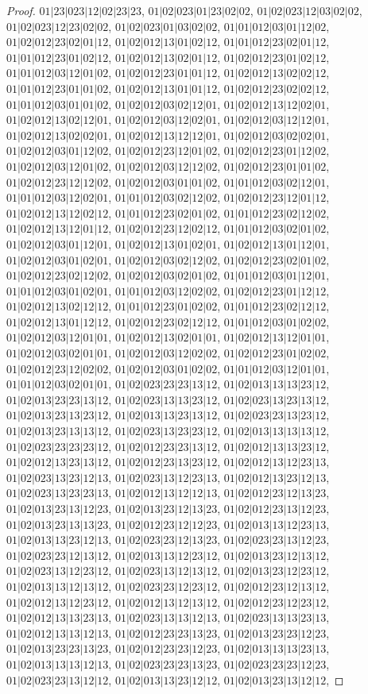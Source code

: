 \documentclass[12pt]{article}
\theoremstyle{plain}
\theoremstyle{definition}
\theoremstyle{remark}
\begin{document}
\begin{proof}
$01|23|023|12|02|23|23$, $01|02|023|01|23|02|02$, $01|02|023|12|03|02|02$, $01|02|023|12|23|02|02$, $01|02|023|01|03|02|02$, $01|01|012|03|01|12|02$, $01|02|012|23|02|01|12$, $01|02|012|13|01|02|12$, $01|01|012|23|02|01|12$, $01|01|012|23|01|02|12$, $01|02|012|13|02|01|12$, $01|02|012|23|01|02|12$, $01|01|012|03|12|01|02$, $01|02|012|23|01|01|12$, $01|02|012|13|02|02|12$, $01|01|012|23|01|01|02$, $01|02|012|13|01|01|12$, $01|02|012|23|02|02|12$, $01|01|012|03|01|01|02$, $01|02|012|03|02|12|01$, $01|02|012|13|12|02|01$, $01|02|012|13|02|12|01$, $01|02|012|03|12|02|01$, $01|02|012|03|12|12|01$, $01|02|012|13|02|02|01$, $01|02|012|13|12|12|01$, $01|02|012|03|02|02|01$, $01|02|012|03|01|12|02$, $01|02|012|23|12|01|02$, $01|02|012|23|01|12|02$, $01|02|012|03|12|01|02$, $01|02|012|03|12|12|02$, $01|02|012|23|01|01|02$, $01|02|012|23|12|12|02$, $01|02|012|03|01|01|02$, $01|01|012|03|02|12|01$, $01|01|012|03|12|02|01$, $01|01|012|03|02|12|02$, $01|02|012|23|12|01|12$, $01|02|012|13|12|02|12$, $01|01|012|23|02|01|02$, $01|01|012|23|02|12|02$, $01|02|012|13|12|01|12$, $01|02|012|23|12|02|12$, $01|01|012|03|02|01|02$, $01|02|012|03|01|12|01$, $01|02|012|13|01|02|01$, $01|02|012|13|01|12|01$, $01|02|012|03|01|02|01$, $01|02|012|03|02|12|02$, $01|02|012|23|02|01|02$, $01|02|012|23|02|12|02$, $01|02|012|03|02|01|02$, $01|01|012|03|01|12|01$, $01|01|012|03|01|02|01$, $01|01|012|03|12|02|02$, $01|02|012|23|01|12|12$, $01|02|012|13|02|12|12$, $01|01|012|23|01|02|02$, $01|01|012|23|02|12|12$, $01|02|012|13|01|12|12$, $01|02|012|23|02|12|12$, $01|01|012|03|01|02|02$, $01|02|012|03|12|01|01$, $01|02|012|13|02|01|01$, $01|02|012|13|12|01|01$, $01|02|012|03|02|01|01$, $01|02|012|03|12|02|02$, $01|02|012|23|01|02|02$, $01|02|012|23|12|02|02$, $01|02|012|03|01|02|02$, $01|01|012|03|12|01|01$, $01|01|012|03|02|01|01$, $01|02|023|23|23|13|12$, $01|02|013|13|13|23|12$, $01|02|013|23|23|13|12$, $01|02|023|13|13|23|12$, $01|02|023|13|23|13|12$, $01|02|013|23|13|23|12$, $01|02|013|13|23|13|12$, $01|02|023|23|13|23|12$, $01|02|013|23|13|13|12$, $01|02|023|13|23|23|12$, $01|02|013|13|13|13|12$, $01|02|023|23|23|23|12$, $01|02|012|23|23|13|12$, $01|02|012|13|13|23|12$, $01|02|012|13|23|13|12$, $01|02|012|23|13|23|12$, $01|02|012|13|12|23|13$, $01|02|023|13|23|12|13$, $01|02|023|13|12|23|13$, $01|02|012|13|23|12|13$, $01|02|023|13|23|23|13$, $01|02|012|13|12|12|13$, $01|02|012|23|12|13|23$, $01|02|013|23|13|12|23$, $01|02|013|23|12|13|23$, $01|02|012|23|13|12|23$, $01|02|013|23|13|13|23$, $01|02|012|23|12|12|23$, $01|02|013|13|12|23|13$, $01|02|013|13|23|12|13$, $01|02|023|23|12|13|23$, $01|02|023|23|13|12|23$, $01|02|023|23|12|13|12$, $01|02|013|13|12|23|12$, $01|02|013|23|12|13|12$, $01|02|023|13|12|23|12$, $01|02|023|13|12|13|12$, $01|02|013|23|12|23|12$, $01|02|013|13|12|13|12$, $01|02|023|23|12|23|12$, $01|02|012|23|12|13|12$, $01|02|012|13|12|23|12$, $01|02|012|13|12|13|12$, $01|02|012|23|12|23|12$, $01|02|012|13|13|23|13$, $01|02|023|13|13|12|13$, $01|02|023|13|13|23|13$, $01|02|012|13|13|12|13$, $01|02|012|23|23|13|23$, $01|02|013|23|23|12|23$, $01|02|013|23|23|13|23$, $01|02|012|23|23|12|23$, $01|02|013|13|13|23|13$, $01|02|013|13|13|12|13$, $01|02|023|23|23|13|23$, $01|02|023|23|23|12|23$, $01|02|023|23|13|12|12$, $01|02|013|13|23|12|12$, $01|02|013|23|13|12|12$, 
\end{proof}
\end{document}
